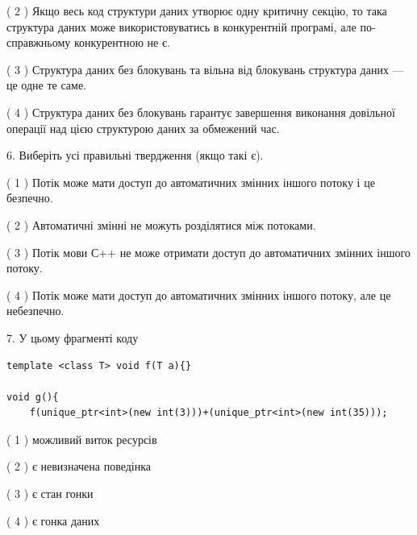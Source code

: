 \documentclass[12pt, ukrainian]{article}
\begin{document}
\begin {large}
{( 2 ) Якщо весь код структури даних утворює одну критичну секцію, то така структура даних може використовуватись в конкурентній програмі, але по-справжньо\-му конкурентною не є.%

( 3 ) Структура даних без блокувань та вільна від блокувань структура даних --- це одне те саме.%

( 4 ) Структура даних без блокувань гарантує завершення виконання довільної операції над цією структурою даних за обмежений час.%
\newpage



\vspace{5mm}
6. Виберіть усі правильні твердження (якщо такі є).\par
\vspace{2mm}

( 1 ) Потік може мати доступ до автоматичних змінних іншого потоку і це безпечно.%

( 2 ) Автоматичні змінні не можуть розділятися між потоками.%

( 3 ) Потік мови С++ не може отримати доступ до автоматичних змінних іншого потоку.%

( 4 ) Потік може мати доступ до автоматичних змінних іншого потоку, але це небезпечно.%


\vspace{5mm}
7. У цьому фрагменті коду
\begin{verbatim}
template <class T> void f(T a){}

void g(){
    f(unique_ptr<int>(new int(3)))+(unique_ptr<int>(new int(35)));
\end{verbatim}

( 1 ) можливий виток ресурсів%

( 2 ) є невизначена поведінка%

( 3 ) є стан гонки%

( 4 ) є гонка даних%
}
\end {large}
\end{document}
